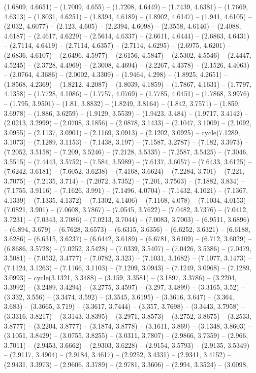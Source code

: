 (1.6809, 4.6651) -- (1.7009, 4.655) -- (1.7208, 4.6449) -- (1.7439, 4.6381) -- (1.7669, 4.6313) -- (1.8031, 4.6251) -- (1.8394, 4.6189) -- (1.8902, 4.6147) -- (1.941, 4.6105) -- (2.032, 4.6077) -- (2.123, 4.605) -- (2.2394, 4.6098) -- (2.3558, 4.6146) -- (2.4088, 4.6187) -- (2.4617, 4.6229) -- (2.5614, 4.6337) -- (2.6611, 4.6444) -- (2.6863, 4.6431) -- (2.7114, 4.6419) -- (2.7114, 4.6357) -- (2.7114, 4.6295) -- (2.6975, 4.6201) -- (2.6836, 4.6107) -- (2.6496, 4.5977) -- (2.6156, 4.5847) -- (2.5302, 4.5546) -- (2.4447, 4.5245) -- (2.3728, 4.4969) -- (2.3008, 4.4694) -- (2.2267, 4.4378) -- (2.1526, 4.4063) -- (2.0764, 4.3686) -- (2.0002, 4.3309) -- (1.9464, 4.298) -- (1.8925, 4.2651) -- (1.8568, 4.2369) -- (1.8212, 4.2087) -- (1.8039, 4.1859) -- (1.7867, 4.1631) -- (1.7797, 4.1358) -- (1.7728, 4.1086) -- (1.7757, 4.0769) -- (1.7785, 4.0451) -- (1.7868, 3.9976) -- (1.795, 3.9501) -- (1.81, 3.8832) -- (1.8249, 3.8164) -- (1.842, 3.7571) -- (1.859, 3.6978) -- (1.886, 3.6259) -- (1.9129, 3.5539) -- (1.9423, 3.484) -- (1.9717, 3.4142) -- (2.0213, 3.2999) -- (2.0708, 3.1856) -- (2.0878, 3.1433) -- (2.1047, 3.1009) -- (2.1092, 3.0955) -- (2.1137, 3.0901) -- (2.1169, 3.0913) -- (2.1202, 3.0925) -- cycle(7.1289, 3.1073) -- (7.1289, 3.1153) -- (7.1438, 3.197) -- (7.1587, 3.2787) -- (7.182, 3.3973) -- (7.2052, 3.5158) -- (7.209, 3.5246) -- (7.2128, 3.5335) -- (7.2587, 3.5425) -- (7.3046, 3.5515) -- (7.4443, 3.5752) -- (7.584, 3.5989) -- (7.6137, 3.6057) -- (7.6433, 3.6125) -- (7.6242, 3.6181) -- (7.6052, 3.6238) -- (7.4168, 3.6624) -- (7.2284, 3.701) -- (7.221, 3.7075) -- (7.2135, 3.714) -- (7.2072, 3.7352) -- (7.201, 3.7563) -- (7.1882, 3.834) -- (7.1755, 3.9116) -- (7.1626, 3.991) -- (7.1496, 4.0704) -- (7.1432, 4.1021) -- (7.1367, 4.1339) -- (7.1335, 4.1372) -- (7.1302, 4.1406) -- (7.1168, 4.078) -- (7.1034, 4.0153) -- (7.0821, 3.901) -- (7.0608, 3.7867) -- (7.0545, 3.7622) -- (7.0482, 3.7376) -- (7.0412, 3.7231) -- (7.0343, 3.7086) -- (7.0213, 3.7044) -- (7.0083, 3.7003) -- (6.9511, 3.6896) -- (6.894, 3.679) -- (6.7628, 3.6573) -- (6.6315, 3.6356) -- (6.6252, 3.6321) -- (6.6188, 3.6286) -- (6.6315, 3.6237) -- (6.6442, 3.6189) -- (6.6781, 3.6109) -- (6.712, 3.6029) -- (6.8686, 3.5728) -- (7.0252, 3.5428) -- (7.0339, 3.5407) -- (7.0426, 3.5386) -- (7.0479, 3.5081) -- (7.0532, 3.4777) -- (7.0782, 3.323) -- (7.1031, 3.1682) -- (7.1077, 3.1473) -- (7.1124, 3.1263) -- (7.1166, 3.1103) -- (7.1209, 3.0943) -- (7.1249, 3.0968) -- (7.1289, 3.0993) -- cycle(3.1321, 3.3488) -- (3.159, 3.3581) -- (3.1897, 3.3786) -- (3.2204, 3.3992) -- (3.2489, 3.4294) -- (3.2775, 3.4597) -- (3.297, 3.4899) -- (3.3165, 3.52) -- (3.332, 3.556) -- (3.3474, 3.592) -- (3.3545, 3.6195) -- (3.3616, 3.647) -- (3.364, 3.683) -- (3.3665, 3.719) -- (3.3617, 3.7444) -- (3.357, 3.7698) -- (3.3443, 3.7958) -- (3.3316, 3.8217) -- (3.3143, 3.8395) -- (3.2971, 3.8573) -- (3.2752, 3.8675) -- (3.2533, 3.8777) -- (3.2204, 3.8777) -- (3.1874, 3.8778) -- (3.1611, 3.869) -- (3.1348, 3.8603) -- (3.1051, 3.8429) -- (3.0755, 3.8255) -- (3.0311, 3.7807) -- (2.9866, 3.7359) -- (2.966, 3.7011) -- (2.9453, 3.6662) -- (2.9303, 3.6228) -- (2.9154, 3.5793) -- (2.9135, 3.5349) -- (2.9117, 3.4904) -- (2.9184, 3.4617) -- (2.9252, 3.4331) -- (2.9341, 3.4152) -- (2.9431, 3.3973) -- (2.9606, 3.3789) -- (2.9781, 3.3606) -- (2.994, 3.3524) -- (3.0098, 